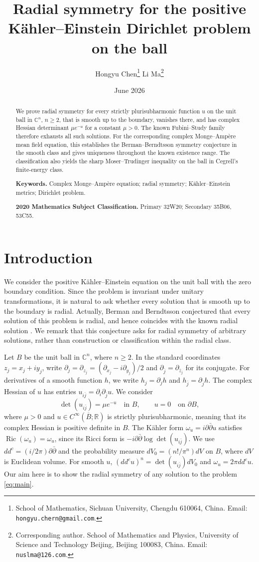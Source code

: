 \documentclass[11pt]{article}
\title{Radial symmetry for the positive K\"ahler--Einstein Dirichlet problem on the ball}
\author{%
Hongyu Chen\thanks{School of Mathematics, Sichuan University,
Chengdu 610064, China.
Email: \texttt{hongyu.chern@gmail.com}.}
\qquad
Li Ma\thanks{Corresponding author.
School of Mathematics and Physics,
University of Science and Technology Beijing,
Beijing 100083, China.
Email: \texttt{nuslma@126.com}.}
}
\date{June 2026}
\newcommand{\C}{\mathbb C}
\newcommand{\R}{\mathbb R}
\newcommand{\Ric}{\operatorname{Ric}}
\begin{document}
\maketitle

\begin{abstract}
We prove radial symmetry for every strictly plurisubharmonic function $u$
on the unit ball in $\C^n$, $n\ge2$, that is smooth up to the boundary,
vanishes there, and has complex Hessian determinant $\mu e^{-u}$ for a
constant $\mu>0$.
The known Fubini--Study family therefore exhausts all such solutions.
For the corresponding complex Monge--Amp\`ere mean field equation, this
establishes the Berman--Berndtsson symmetry conjecture in the smooth
class and gives uniqueness throughout the known existence range.
The classification also yields the sharp Moser--Trudinger inequality
on the ball in Cegrell's finite-energy class.

\noindent\textbf{Keywords.} Complex Monge--Amp\`ere equation; radial symmetry;
K\"ahler--Einstein metrics; Dirichlet problem.

\medskip
\noindent\textbf{2020 Mathematics Subject Classification.} Primary 32W20; Secondary 35B06, 53C55.
\end{abstract}

\section{Introduction}
We consider the positive K\"ahler--Einstein equation on the unit ball with
the zero boundary condition. Since the problem is invariant under unitary
transformations, it is natural to ask whether every solution that is smooth
up to the boundary is radial. Actually, Berman and Berndtsson conjectured that every solution of this problem is radial, and 
hence coincides with the known radial solution \cite[Conjecture~7.6]{BB2022}. We remark that
this conjecture asks for radial symmetry of arbitrary solutions, rather than
construction or classification within the radial class.

Let $B$ be the unit ball in $\C^n$, where $n\ge2$. In the standard
coordinates $z_j=x_j+iy_j$, write
$\partial_j=\partial_{z_j}=(\partial_{x_j}-i\partial_{y_j})/2$ and
$\partial_{\bar j}=\partial_{\bar z_j}$ for its conjugate.
For derivatives of a smooth function $h$, we write $h_j=\partial_jh$
and $h_{\bar j}=\partial_{\bar j}h$. The complex Hessian of $u$ has
entries $u_{i\bar j}=\partial_i\partial_{\bar j}u$. We consider
\begin{equation}\label{eq:main}
 \det(u_{i\bar j})=\mu e^{-u}\quad\text{in }B,
 \qquad u=0\quad\text{on }\partial B,
\end{equation}
where $\mu>0$ and $u\in C^\infty(\overline B;\R)$ is strictly
plurisubharmonic, meaning that its complex Hessian is positive definite
in $B$. The K\"ahler form $\omega_u=i\partial\bar\partial u$ satisfies
$\Ric(\omega_u)=\omega_u$, since its Ricci form is
$-i\partial\bar\partial\log\det(u_{i\bar j})$. We use $dd^c=(i/2\pi)\partial\bar\partial$ and the probability measure
$dV_0=(n!/\pi^n)dV$ on $B$, where $dV$ is Euclidean volume. For
smooth $u$, $(dd^cu)^n=\det(u_{i\bar j})dV_0$ and
$\omega_u=2\pi dd^cu$.
Our aim here is to show the radial symmetry of any solution to the problem
\eqref{eq:main}. 
\end{document}
